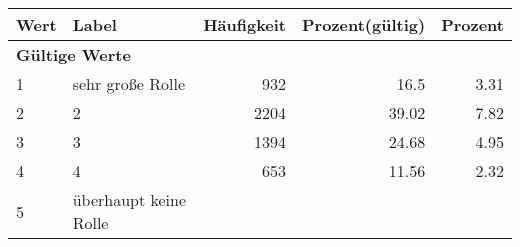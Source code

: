      \begin{longtable}{lXrrr}
     \toprule
     \textbf{Wert} & \textbf{Label} & \textbf{Häufigkeit} & \textbf{Prozent(gültig)} & \textbf{Prozent} \\
     \endhead
     \midrule
     \multicolumn{5}{l}{\textbf{Gültige Werte}}\\

     1 &
     \multicolumn{1}{X}{ sehr große Rolle   } &


       \num{932} &
       \num[round-mode=places,round-precision=2]{16.5} &
         \num[round-mode=places,round-precision=2]{3.31} \\

     2 &
     \multicolumn{1}{X}{ 2   } &


       \num{2204} &
       \num[round-mode=places,round-precision=2]{39.02} &
         \num[round-mode=places,round-precision=2]{7.82} \\

     3 &
     \multicolumn{1}{X}{ 3   } &


       \num{1394} &
       \num[round-mode=places,round-precision=2]{24.68} &
         \num[round-mode=places,round-precision=2]{4.95} \\

     4 &
     \multicolumn{1}{X}{ 4   } &


       \num{653} &
       \num[round-mode=places,round-precision=2]{11.56} &
         \num[round-mode=places,round-precision=2]{2.32} \\

     5 &
     \multicolumn{1}{X}{ überhaupt keine Rolle   } &



\end{longtable}
